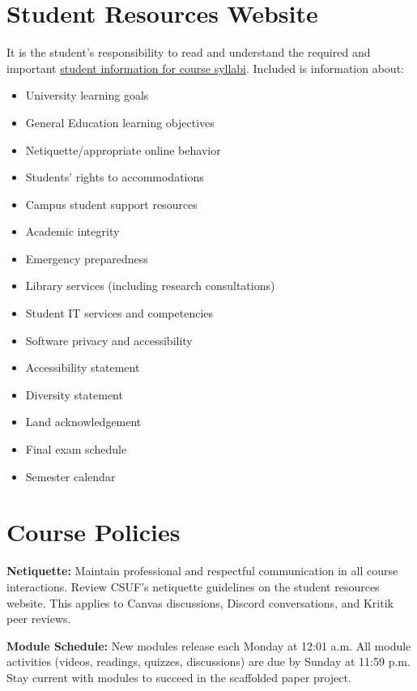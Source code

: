 \documentclass[12pt]{article}     %
\begin{document}
\section{Student Resources Website}
It is the student's responsibility to read and understand the required and important \href{https://fdc.fullerton.edu/teaching/student-info-syllabi.html}{student information for course syllabi}. Included is information about:

\begin{itemize}
\item University learning goals
\item General Education learning objectives
\item Netiquette/appropriate online behavior
\item Students' rights to accommodations
\item Campus student support resources
\item Academic integrity
\item Emergency preparedness
\item Library services (including research consultations)
\item Student IT services and competencies
\item Software privacy and accessibility
\item Accessibility statement
\item Diversity statement
\item Land acknowledgement
\item Final exam schedule
\item Semester calendar
\end{itemize}

\section{Course Policies}

\noindent \textbf{Netiquette:} Maintain professional and respectful communication in all course interactions. Review CSUF's netiquette guidelines on the student resources website. This applies to Canvas discussions, Discord conversations, and Kritik peer reviews.

\vspace{0.5em}
\noindent \textbf{Module Schedule:} New modules release each Monday at 12:01 a.m. All module activities (videos, readings, quizzes, discussions) are due by Sunday at 11:59 p.m. Stay current with modules to succeed in the scaffolded paper project.
\end{document}
